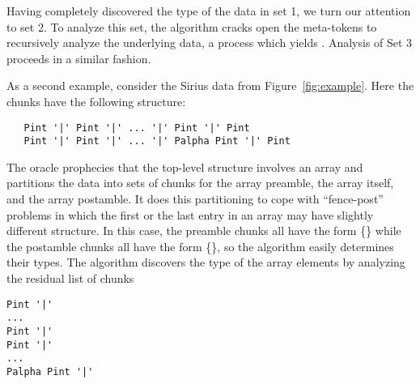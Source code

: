 Having completely discovered the type of the data in set 1, we turn
our attention to set 2. 
To analyze this set, the algorithm cracks open the \cd{[*]} meta-tokens
to recursively analyze the underlying data, a process which yields 
. Analysis of Set 3 proceeds in a similar 
fashion.


As a second example, consider the Sirius data from Figure~\ref{fig:example}.
Here the chunks have the following structure:

{\small
\begin{verbatim}
   Pint '|' Pint '|' ... '|' Pint '|' Pint
   Pint '|' Pint '|' ... '|' Palpha Pint '|' Pint
\end{verbatim}
}%

\noindent
The oracle prophecies that the top-level structure involves
an array and partitions the data into sets of chunks for the
array preamble, the array itself, and the array postamble.  It does
this partitioning to cope with ``fence-post'' problems in which 
the first or the last entry in an array may have slightly different structure.
In this case, the
preamble chunks all have the form \{\} while the
postamble chunks all have the form \{\}, so the algorithm
easily determines their types. The algorithm discovers the
type of the array elements by analyzing the residual list of chunks

{\small
\begin{verbatim}
Pint '|' 
... 
Pint '|' 
Pint '|'
...
Palpha Pint '|'
\end{verbatim}
}%

